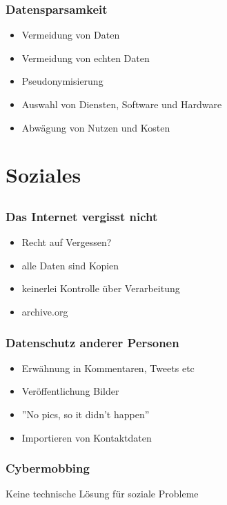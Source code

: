 \documentclass[12pt]{beamer}
\begin{document}
\begin{frame}
  \frametitle{Datensparsamkeit}
  \begin{itemize}
    \item<2-> Vermeidung von Daten
    \item<3-> Vermeidung von echten Daten
    \item<4-> Pseudonymisierung
    \item<5-> Auswahl von Diensten, Software und Hardware
    \item<6-> Abwägung von Nutzen und Kosten
  \end{itemize}
\end{frame}

\section{Soziales}
\subsection{}

\begin{frame}
  \frametitle{Das Internet vergisst nicht}
  \begin{itemize}
    \item<2-> Recht auf Vergessen?
    \item<3-> alle Daten sind Kopien
    \item<4-> keinerlei Kontrolle über Verarbeitung
    \item<5-> archive.org
  \end{itemize}
\end{frame}

\begin{frame}
  \frametitle{Datenschutz anderer Personen}
  \begin{itemize}
    \item<2-> Erwähnung in Kommentaren, Tweets etc
    \item<3-> Veröffentlichung Bilder
    \item<4-> ''No pics, so it didn't happen''
    \item<5-> Importieren von Kontaktdaten
  \end{itemize}
\end{frame}

\begin{frame}
  \frametitle{Cybermobbing}
  \pause
  \begin{center}
    \large{Keine technische Lösung für soziale Probleme}
  \end{center}
\end{frame}
\end{document}
